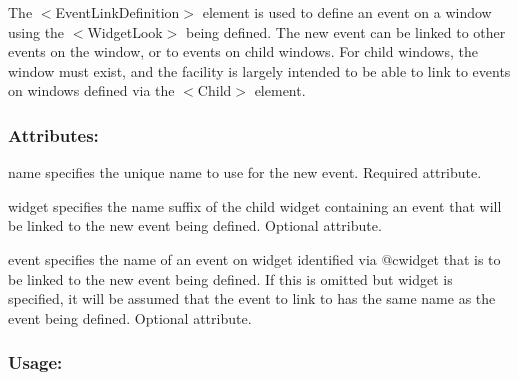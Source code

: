 The {\ttfamily $<$Event\+Link\+Definition$>$} element is used to define an event on a window using the {\ttfamily $<$Widget\+Look$>$} being defined. The new event can be linked to other events on the window, or to events on child windows. For child windows, the window must exist, and the facility is largely intended to be able to link to events on windows defined via the {\ttfamily $<$Child$>$} element.\hypertarget{fal_element_ref_fal_elem_ref_eventlinkdefintion_2}{}\subsubsection{Attributes\+:}\label{fal_element_ref_fal_elem_ref_eventlinkdefintion_2}
\begin{DoxyItemize}
\item {\ttfamily name} specifies the unique name to use for the new event. Required attribute. \item {\ttfamily widget} specifies the name suffix of the child widget containing an event that will be linked to the new event being defined. Optional attribute. \item {\ttfamily event} specifies the name of an event on widget identified via @cwidget that is to be linked to the new event being defined. If this is omitted but {\ttfamily widget} is specified, it will be assumed that the event to link to has the same name as the event being defined. Optional attribute.\end{DoxyItemize}
\hypertarget{fal_element_ref_fal_elem_ref_eventlinkdefintion_3}{}\subsubsection{Usage\+:}\label{fal_element_ref_fal_elem_ref_eventlinkdefintion_3}

